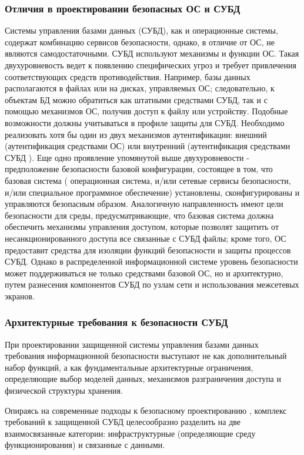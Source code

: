 \subsubsection{Отличия в проектировании безопасных ОС и СУБД}
Системы управления базами данных (СУБД), как и операционные системы, содержат комбинацию сервисов
безопасности, однако, в отличие от ОС, не являются самодостаточными. СУБД используют механизмы
и функции ОС. Такая двухуровневость ведет к появлению специфических угроз и требует привлечения
соответствующих средств противодействия. Например, базы данных располагаются в файлах или на дисках,
управляемых ОС; следовательно, к объектам БД можно обратиться как штатными средствами СУБД, так и с
помощью механизмов ОС, получив доступ к файлу или устройству.
Подобные возможности должны учитываться в профиле защиты для СУБД.
Необходимо реализовать хотя бы один из двух механизмов аутентификации: внешний (аутентификация средствами ОС)
или внутренний (аутентификация средствами СУБД ).
Еще одно проявление упомянутой выше двухуровневости - предположение безопасности базовой конфигурации,
состоящее в том, что базовая система ( операционная система, и/или сетевые сервисы безопасности, и/или
специальное программное обеспечение) установлены, сконфигурированы и управляются безопасным образом.
Аналогичную направленность имеют цели безопасности для среды, предусматривающие, что базовая система
должна обеспечить механизмы управления доступом, которые позволят защитить от несанкционированного доступа
все связанные с СУБД файлы; кроме того, ОС предоставит средства для изоляции функций безопасности и защиты процессов СУБД.
Однако в распределенной информационной системе уровень безопасности может поддерживаться не только средствами базовой ОС,
но и архитектурно, путем разнесения компонентов СУБД по узлам сети и использования межсетевых экранов.

\subsubsection{Архитектурные требования к безопасности СУБД}

При проектировании защищенной системы управления базами данных требования информационной безопасности выступают не как дополнительный набор функций, а как фундаментальные архитектурные ограничения, определяющие выбор моделей данных, механизмов разграничения доступа и физической структуры хранения. 

Опираясь на современные подходы к безопасному проектированию \autocite{LAPA}, комплекс требований к защищенной СУБД целесообразно разделить на две взаимосвязанные категории: инфраструктурные (определяющие среду функционирования) и связанные с данными.

